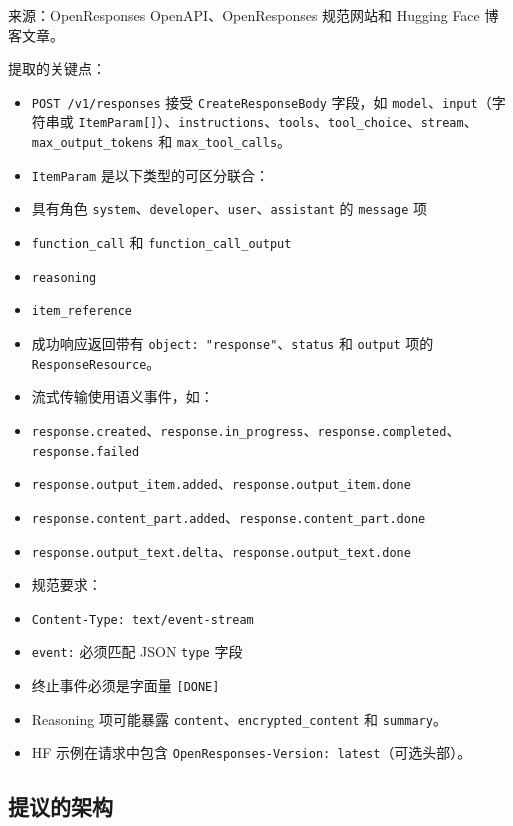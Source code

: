 来源：OpenResponses OpenAPI、OpenResponses 规范网站和 Hugging Face 博客文章。

提取的关键点：

\begin{itemize}
  \item \texttt{POST /v1/responses} 接受 \texttt{CreateResponseBody} 字段，如 \texttt{model}、\texttt{input}（字符串或 \texttt{ItemParam[]}）、\texttt{instructions}、\texttt{tools}、\texttt{tool\_choice}、\texttt{stream}、\texttt{max\_output\_tokens} 和 \texttt{max\_tool\_calls}。
  \item \texttt{ItemParam} 是以下类型的可区分联合：
  \item 具有角色 \texttt{system}、\texttt{developer}、\texttt{user}、\texttt{assistant} 的 \texttt{message} 项
  \item \texttt{function\_call} 和 \texttt{function\_call\_output}
  \item \texttt{reasoning}
  \item \texttt{item\_reference}
  \item 成功响应返回带有 \texttt{object: "response"}、\texttt{status} 和 \texttt{output} 项的 \texttt{ResponseResource}。
  \item 流式传输使用语义事件，如：
  \item \texttt{response.created}、\texttt{response.in\_progress}、\texttt{response.completed}、\texttt{response.failed}
  \item \texttt{response.output\_item.added}、\texttt{response.output\_item.done}
  \item \texttt{response.content\_part.added}、\texttt{response.content\_part.done}
  \item \texttt{response.output\_text.delta}、\texttt{response.output\_text.done}
  \item 规范要求：
  \item \texttt{Content-Type: text/event-stream}
  \item \texttt{event:} 必须匹配 JSON \texttt{type} 字段
  \item 终止事件必须是字面量 \texttt{[DONE]}
  \item Reasoning 项可能暴露 \texttt{content}、\texttt{encrypted\_content} 和 \texttt{summary}。
  \item HF 示例在请求中包含 \texttt{OpenResponses-Version: latest}（可选头部）。
\end{itemize}


\subsection{提议的架构}



